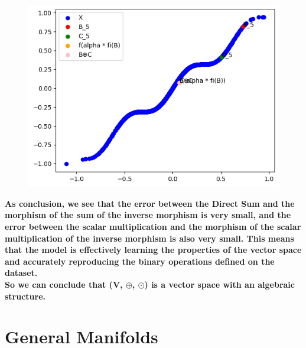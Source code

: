 \documentclass{report}
\begin{document}
            \begin{figure}[h]
                \centering
                \begin{minipage}{0.5\textwidth}
                    \centering
                    \includegraphics[width=0.9\linewidth]{./images/alpha5.png} %
                \end{minipage}%
                \begin{minipage}{0.5\textwidth}
                    \centering
                \end{minipage}
            \end{figure}
        \newpage


        \textbf{As conclusion, we see that the error between the Direct Sum and the morphism of the sum of the inverse morphism is very small, and the error between the scalar multiplication and the morphism of the scalar multiplication of the inverse morphism is also very small. This means that the model is effectively learning the properties of the vector space and accurately reproducing the binary operations defined on the dataset.\\
        So we can conclude that (V, $\oplus$, $\odot$) is a vector space with an algebraic structure.}


\section{General Manifolds}
\end{document}
